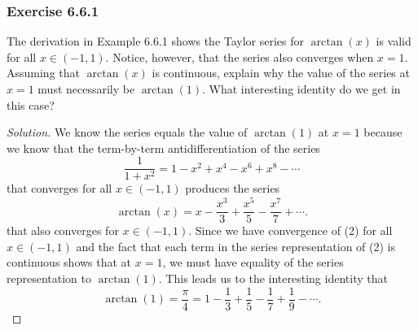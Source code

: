 \subsubsection{Exercise 6.6.1} The derivation in Example 6.6.1 shows the Taylor series for \( \arctan(x)  \) is valid for all \(  x \in (-1,1) \). Notice, however, that the series also converges when \( x =1  \). Assuming that \( \arctan(x)  \) is continuous, explain why the value of the series at \( x = 1  \) must necessarily be \( \arctan(1)  \). What interesting identity do we get in this case?
\begin{proof}[Solution]
We know the series equals the value of \( \arctan(1) \) at \( x = 1  \) because we know that the term-by-term antidifferentiation of the series
\[  \frac{ 1 }{ 1 + x^2  } = 1 - x^{2} + x^{4} - x^{6} + x^{8} - \dotsb  \tag{1}\]
that converges for all \( x \in (-1,1)  \) produces the series 
\[  \arctan(x) = x - \frac{ x^{3} }{ 3  } + \frac{ x^{5} }{ 5 } - \frac{ x^{7} }{ 7 } + \dotsb .  \tag{2}\]
that also converges for \( x \in (-1 ,1 ) \). Since we have convergence of (2) for all \( x \in (-1,1) \) and the fact that each term in the series representation of (2) is continuous shows that at \( x = 1  \), we must have equality of the series representation to \( \arctan(1)  \). This leads us to the interesting identity that 
\[  \arctan(1) = \frac{ \pi  }{ 4 }  = 1 - \frac{ 1 }{ 3 } + \frac{ 1 }{ 5 }  - \frac{ 1 }{ 7 }  + \frac{ 1 }{ 9 } - \dotsb . \]
\end{proof}

